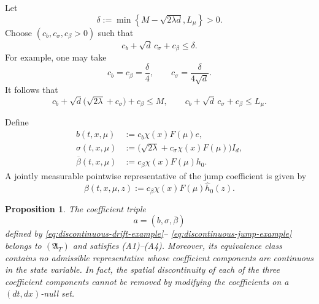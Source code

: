 \documentclass[12pt,oneside, reqno]{amsart}
\newtheorem{proposition}[theorem]{Proposition}
\numberwithin{equation}{section}
\begin{document}
	Let
	\[
	\delta
	:=
	\min\left\{
	M-\sqrt{2\lambda d},
	L_\mu
	\right\}>0.
	\]
	Choose $(c_b,c_\sigma,c_\beta>0)$ such that
	\begin{equation}
		\label{eq:example-small-constant-condition}
		c_b+\sqrt d\,c_\sigma+c_\beta
		\leq
		\delta.
	\end{equation}
	For example, one may take
	\[
	c_b=c_\beta=\frac{\delta}{4},
	\qquad
	c_\sigma=\frac{\delta}{4\sqrt d}.
	\]
	It follows that
	\begin{equation}
		\label{eq:example-constant-conditions}
		c_b+\sqrt d\bigl(\sqrt{2\lambda}+c_\sigma\bigr)+c_\beta
		\leq M,
		\qquad
		c_b+\sqrt d\,c_\sigma+c_\beta
		\leq L_\mu.
	\end{equation}
	
	Define
	\begin{align}
		b(t,x,\mu)
		&:=
		c_b\chi(x)F(\mu)e,
		\label{eq:discontinuous-drift-example}\\
		\sigma(t,x,\mu)
		&:=
		\bigl(
		\sqrt{2\lambda}
		+c_\sigma\chi(x)F(\mu)
		\bigr)I_d,
		\label{eq:discontinuous-diffusion-example}\\
		\overline\beta(t,x,\mu)
		&:=
		c_\beta\chi(x)F(\mu)h_0.
		\label{eq:discontinuous-jump-example}
	\end{align}
	A jointly measurable pointwise representative of the jump coefficient
	is given by
	\begin{equation}
		\label{eq:discontinuous-jump-representative}
		\beta(t,x,\mu,z)
		:=
		c_\beta\chi(x)F(\mu)\widehat h_0(z).
	\end{equation}
	
	\begin{proposition}
		\label{prop:discontinuous-example-in-completion}
		The coefficient triple
		\[
		a=(b,\sigma,\overline\beta)
		\]
		defined by
		\eqref{eq:discontinuous-drift-example}--
		\eqref{eq:discontinuous-jump-example}
		belongs to $(\mathfrak A_T)$ and satisfies
		\textnormal{(A1)}--\textnormal{(A4)}. Moreover, its equivalence
		class contains no admissible representative whose coefficient
		components are continuous in the state variable. In fact, the
		spatial discontinuity of each of the three coefficient components
		cannot be removed by modifying the coefficients on a
		$(dt,dx)$-null set.
	\end{proposition}
	
\end{document}
